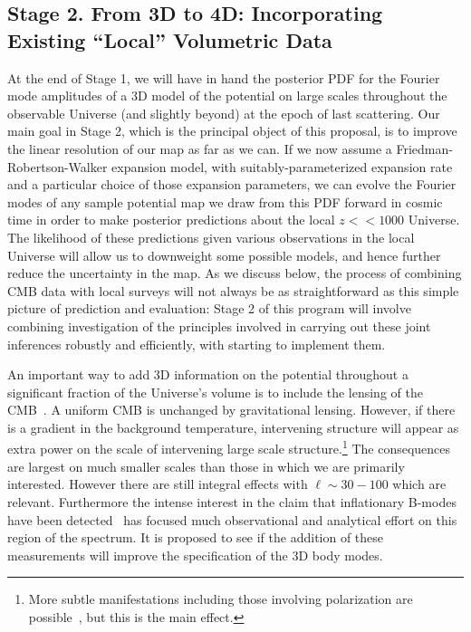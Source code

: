 \documentclass[psfig,12pt]{article}
\def\ni{\noindent}
\begin{document}
{%

\subsection{Stage 2. From 3D to 4D: Incorporating Existing ``Local'' Volumetric Data}

At the end of Stage 1, we will have in hand the posterior PDF for the
Fourier mode amplitudes of a 3D model of the potential on large scales
throughout the observable Universe (and slightly beyond) at the epoch of
last scattering.
Our main goal in Stage 2, which is the principal object of this proposal,
is to improve the linear resolution of our map as far as we can.
If we now assume a Friedman-Robertson-Walker expansion
model, with suitably-parameterized expansion rate and a particular
choice of those expansion parameters,  we can evolve the Fourier modes
of any sample potential map we draw from this PDF forward in cosmic
time in order to make posterior  predictions about the local
$z << 1000$ Universe. The likelihood of these predictions given various
observations in the local Universe will allow us to downweight some
possible models, and hence further reduce the uncertainty in the map.
As we discuss below, the process of combining CMB data with local surveys
will not always be as straightforward as this simple picture of
prediction and evaluation: Stage 2 of this program will involve combining
investigation of the principles involved in carrying out these joint inferences robustly and
efficiently, with starting to implement them.

\ni{\bf CMB Lensing and ISW Measurements:}
An important way to add 3D information on the potential throughout a
significant fraction of the Universe's volume is to include the lensing
of the CMB~\cite{Planck2015cosmopara}. A uniform CMB is unchanged by
gravitational lensing. However, if there is a gradient in the background
temperature, intervening structure will appear as extra power on the
scale of intervening large scale structure.\footnote{More subtle
manifestations including those involving polarization are
possible~\cite{Hu:2002}, but this is the main effect.} The consequences
are largest on much smaller scales than those in which we are primarily
interested. However there are still integral effects with
$\ell\sim30-100$ which are relevant. Furthermore the intense interest in
the claim that inflationary B-modes have been
detected~\cite{Planck2015cosmopara}  has focused much observational and
analytical effort on this region of the spectrum. It is proposed to see
if the addition of these measurements will improve the specification of
the 3D body modes.

}
\end{document}

